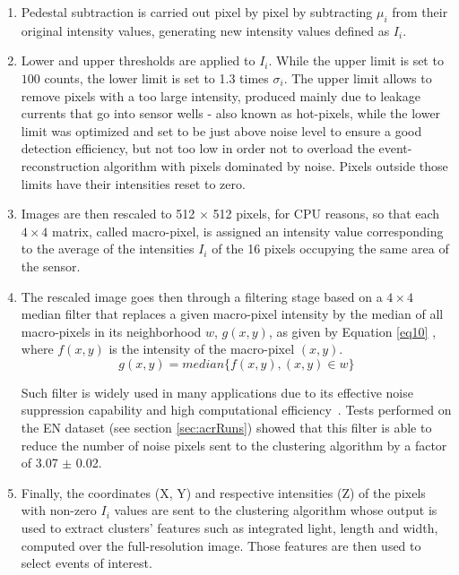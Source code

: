 \documentclass[a4paper,11pt]{article}
\begin{document}
\begin{enumerate}
\addtocounter{enumi}{0}
    
    \item Pedestal subtraction is carried out pixel by pixel by subtracting $\mu_i$ from their original intensity values, generating new intensity values defined as $I_i$. 

    \item Lower and upper thresholds are applied to $I_i$.
    While the upper limit is set to $100$ counts, the lower limit is set to 1.3 times $\sigma_i$.
    The upper limit allows to remove pixels with a too large intensity, produced mainly due to leakage currents that go into sensor wells - also known as hot-pixels, while the lower limit was optimized and set to be just above noise level to ensure a good detection efficiency, but not too low in order not to overload the event-reconstruction algorithm with pixels dominated by noise. Pixels outside those limits have their intensities reset to zero.
    
    
    \item Images are then rescaled to 512 $\times$ 512 pixels, for CPU reasons, so that each $4 \times 4$ matrix, called macro-pixel, is assigned an intensity value corresponding to the average of the intensities $I_i$ of the 16 pixels occupying the same area of the sensor. 
    
    \item The rescaled image goes then through a filtering stage based on a $4 \times 4$ median filter that replaces a given macro-pixel intensity by the median of all macro-pixels in its neighborhood $w$, $g(x,y)$, as given by Equation \ref{eq10} \cite{filterStudy}, where $f(x,y)$ is the intensity of the macro-pixel $(x,y)$.
        \begin{equation}
             g(x,y) = median\{f(x,y), (x,y) \in w\}
             \label{eq10}
         \end{equation}
        
    Such filter is widely used in many applications due to its effective noise suppression capability and high computational efficiency~\cite{gonzalez2002digital}.
    Tests performed on the EN dataset (see section \ref{sec:acrRuns}) showed that this filter is able to reduce the number of noise pixels sent to the clustering algorithm by a factor of 3.07 $\pm$ 0.02.
 
    
    \item Finally, the coordinates (X, Y) and respective intensities (Z) of the pixels with non-zero $I_i$ values are sent to the clustering algorithm whose output is used to extract clusters' features such as integrated light, length and width, computed over the full-resolution image. Those features are then used to select events of interest. 
\end{enumerate}
\end{document}
